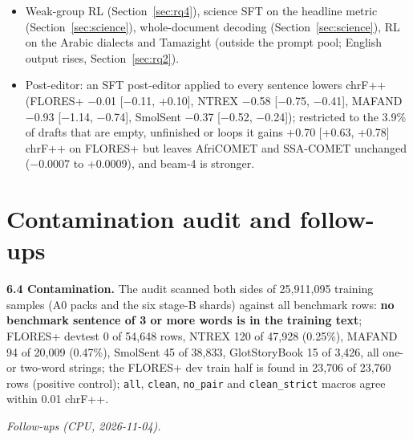 \begin{itemize}
\item Weak-group RL (Section~\ref{sec:rq4}), science SFT on the headline metric (Section~\ref{sec:science}), whole-document decoding (Section~\ref{sec:science}), RL on the Arabic dialects and Tamazight (outside the prompt pool; English output rises, Section~\ref{sec:rq2}).
\item Post-editor: an SFT post-editor applied to every sentence lowers chrF++ (FLORES+ \ensuremath{-}0.01 [\ensuremath{-}0.11, +0.10], NTREX \ensuremath{-}0.58 [\ensuremath{-}0.75, \ensuremath{-}0.41], MAFAND \ensuremath{-}0.93 [\ensuremath{-}1.14, \ensuremath{-}0.74], SmolSent \ensuremath{-}0.37 [\ensuremath{-}0.52, \ensuremath{-}0.24]); restricted to the 3.9\% of drafts that are empty, unfinished or loops it gains +0.70 [+0.63, +0.78] chrF++ on FLORES+ but leaves AfriCOMET and SSA-COMET unchanged (\ensuremath{-}0.0007 to +0.0009), and beam-4 is stronger. 
\end{itemize}

\section{Contamination audit and follow-ups}\label{app:contam}

\textbf{6.4 Contamination.} The audit scanned both sides of 25,911,095 training samples (A0 packs and the six stage-B shards) against all benchmark rows: \textbf{no benchmark sentence of 3 or more words is in the training text}; FLORES+ devtest 0 of 54,648 rows, NTREX 120 of 47,928 (0.25\%), MAFAND 94 of 20,009 (0.47\%), SmolSent 45 of 38,833, GlotStoryBook 15 of 3,426, all one- or two-word strings; the FLORES+ dev train half is found in 23,706 of 23,760 rows (positive control); \texttt{all}, \texttt{clean}, \texttt{no\_\allowbreak{}pair} and \texttt{clean\_\allowbreak{}strict} macros agree within 0.01 chrF++. 

\emph{Follow-ups (CPU, 2026-11-04).} 

